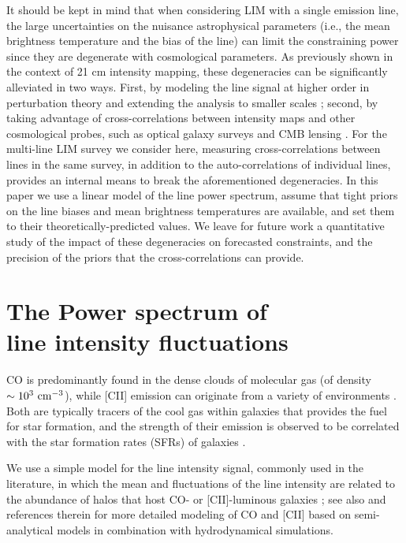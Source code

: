 \documentclass[twocolumn]{aastex631}
\begin{document}
It should be kept in mind that when considering LIM with a single emission line, the large uncertainties on the nuisance astrophysical parameters (i.e., the mean brightness temperature and the bias of the line) can limit the constraining power since they are degenerate with cosmological parameters. As previously shown in the context of 21 cm intensity mapping, these degeneracies can be significantly alleviated in two ways. First, by modeling the line signal at higher order in perturbation theory and extending the analysis to smaller scales \citep{Castorina:2019zho}; second, by taking advantage of cross-correlations between intensity maps and other cosmological probes, such as optical galaxy surveys and CMB lensing \citep{Obuljen:2017jiy,Chen:2018qiu}. For the multi-line LIM survey we consider here, measuring cross-correlations between lines in the same survey, in addition to the auto-correlations of individual lines, provides an internal means to break the aforementioned degeneracies. In this paper we use a linear model of the line power spectrum, assume that tight priors on the line biases and mean brightness temperatures are available, and set them to their theoretically-predicted values. We leave for future work a quantitative study of the impact of these degeneracies on forecasted constraints, and the precision of the priors that the cross-correlations can provide.  \vspace{-.05in} \\


\section{The Power spectrum of \\ line intensity fluctuations \\}\label{sec:linePS}

CO is predominantly found in the dense clouds of
molecular gas (of density $\sim 10^3 \ {\rm cm}^{-3}$), 
while [CII] emission can originate from a variety of environments  \citep{Goldsmith_2012, Lagache_2018}. Both are typically tracers of the cool gas within galaxies that provides the fuel for star formation, and the strength of their emission is observed to be correlated with the star formation rates (SFRs) of galaxies \citep{Tacconi_2013,Herrera-Camus:2014qba}.

We use a simple model for the line intensity signal, commonly used in the literature, in which the mean and fluctuations of the line intensity are related to the abundance of halos that host CO- or [CII]-luminous galaxies \citep{visbal:2010rz, Gong:2011ts, Lidz:2011dx, Silva:2014ira}; see also \citealt{2016MNRAS.461...93P, 2018MNRAS.473..271V, 2018arXiv180511093P, 2018A&A...609A.130L, Yang2021} and references therein for more detailed modeling of CO and [CII] based on semi-analytical models in combination with hydrodynamical simulations.
\end{document}
